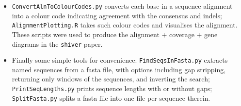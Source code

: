 \documentclass{article}
\newcommand{\shiv}{\texttt{shiver}\xspace}
\begin{document}
\begin{itemize}
\item \texttt{ConvertAlnToColourCodes.py} converts each base in a sequence alignment into a colour code indicating agreement with the consensus and indels; \texttt{AlignmentPlotting.R} takes such colour codes and visualises the alignment.
These scripts were used to produce the alignment + coverage + gene diagrams in the \shiv paper.

\item Finally some simple tools for convenience: \texttt{FindSeqsInFasta.py} extracts named sequences from a fasta file, with options including gap stripping, returning only windows of the sequences, and inverting the search; \texttt{PrintSeqLengths.py} prints sequence lengths with or without gaps; \texttt{SplitFasta.py} splits a fasta file into one file per sequence therein.
\end{itemize}




\end{document}
